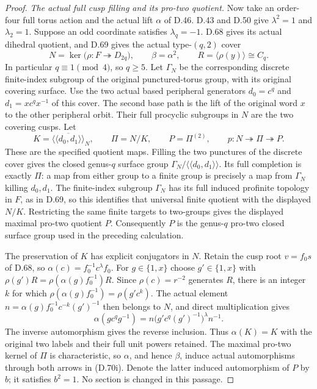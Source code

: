 \begin{proof}
\emph{The actual full cusp filling and its pro-two quotient.}
Now take an order-four full torus action and the
actual lift $\alpha$ of D.46.
D.43 and D.50 give
$\lambda^2=1$ and $\lambda_2=1$.
Suppose an odd coordinate satisfies $\lambda_q=-1$.
D.68 gives its actual dihedral quotient, and D.69
gives the actual type-$(q,2)$ cover
\[
 N=\ker\bigl(\rho:F\twoheadrightarrow D_{2q}\bigr),
 \qquad \beta=\alpha^2,\qquad
 R=\langle\rho(y)\rangle\cong C_q .
                                                               \tag{D.70h}
\]
In particular $q\equiv1\pmod4$, so $q\geq5$.
Let $\Gamma_N$ be the corresponding discrete
finite-index subgroup of the original punctured-torus
group, with its original covering surface.
Use the two actual based peripheral generators
$d_0=c^q$ and $d_1=xc^qx^{-1}$ of this cover.
The second base path is the lift of the original
word $x$ to the other peripheral orbit.
Their full procyclic subgroups in $N$ are the
two covering cusps.
Let
\[
 K=\overline{\langle\!\langle d_0,d_1\rangle\!\rangle}_N,
 \qquad
 \Pi=N/K,\qquad P=\Pi^{(2)},\qquad
 p:N\twoheadrightarrow\Pi\twoheadrightarrow P .
                                                               \tag{D.70i}
\]
These are the specified quotient maps.
Filling the two punctures of the discrete cover
gives the closed genus-$q$ surface group
$\Gamma_N/\langle\!\langle d_0,d_1\rangle\!\rangle$.
Its full completion is exactly $\Pi$:
a map from either group to a finite group is
precisely a map from $\Gamma_N$ killing $d_0,d_1$.
The finite-index subgroup $\Gamma_N$ has its full
induced profinite topology in $F$, as in D.69,
so this identifies that universal finite quotient
with the displayed $N/K$.
Restricting the same finite targets to two-groups
gives the displayed maximal pro-two quotient $P$.
Consequently $P$ is the genus-$q$ pro-two closed
surface group used in the preceding calculation.

The preservation of $K$ has explicit conjugators
in $N$. Retain the cusp root $v=f_0s$ of D.68,
so $\alpha(c)=f_0^{-1}c^\lambda f_0$.
For $g\in\{1,x\}$ choose $g'\in\{1,x\}$
with $\rho(g')R=\rho(\alpha(g)f_0^{-1})R$.
Since $\rho(c)=r^{-2}$ generates $R$, there is
an integer $k$ for which
$\rho(\alpha(g)f_0^{-1})=\rho(g'c^k)$.
The actual element
$n=\alpha(g)f_0^{-1}c^{-k}(g')^{-1}$ then belongs to $N$,
and direct multiplication gives
\[
 \alpha(gc^qg^{-1})
       =n\bigl(g'c^q(g')^{-1}\bigr)^\lambda n^{-1}.
\]
The inverse automorphism gives the reverse inclusion.
Thus $\alpha(K)=K$ with the original two labels
and their full unit powers retained.
The maximal pro-two kernel of $\Pi$ is
characteristic, so $\alpha$, and hence $\beta$,
induce actual automorphisms through both arrows
in (D.70i). Denote the latter induced automorphism
of $P$ by $b$; it satisfies $b^2=1$.
No section is changed in this passage.


\end{proof}

